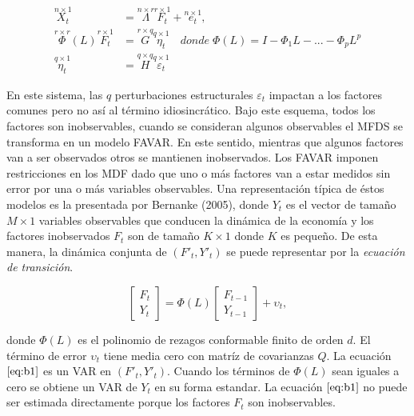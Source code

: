 \documentclass[a4paper,twoside,15pt]{article}
\begin{document}
\begin{align*}
	\overset{n \times 1}{X_t} &=\overset{n \times r}{\Lambda}\overset{r \times 1}{F_t}+\overset{n \times 1}{e_t}, \label{eq:f55} \tag{7} \\
	\overset{r \times r}{\Phi}(L)\overset{r \times 1}{F_t}&=  \overset{r \times q}{G}\overset{q \times 1}{\eta_t}\quad donde\; \Phi(L)=I-\Phi_1L-...-\Phi_pL^p \label{eq:f56} \tag{8}\\
	\overset{q \times 1}{\eta_t} & = \overset{q \times q}{H} \overset{q \times 1}{\varepsilon_t} \label{eq:f57 }\tag{9}
\end{align*}

En este sistema, las $q$ perturbaciones estructurales $\varepsilon_t$ impactan a los factores comunes pero no así al término idiosincrático.
Bajo este esquema, todos los factores son inobservables, cuando se consideran algunos observables el MFDS se transforma en un modelo FAVAR. En este sentido, mientras que algunos factores van a ser observados otros se mantienen inobservados. Los FAVAR imponen restricciones en los MDF dado que uno o más factores van a estar medidos sin error por una o más variables observables. Una representación típica de éstos modelos es la presentada por Bernanke (2005), donde $Y_t$ es el vector de tamaño $M \times 1$ variables observables que conducen la dinámica de la economía y los factores inobservados $F_t$ son de tamaño $K \times 1$ donde $K$ es pequeño. De esta manera, la dinámica conjunta de $(F '_t,Y'_t)$ se puede representar por la \textit{ecuación de transición}.



\begin{equation*}
\begin{bmatrix}
	F_t\\
	Y_t
\end{bmatrix}=\Phi(L)\begin{bmatrix}
	F_{t-1}\\
	Y_{t-1}
\end{bmatrix}+\upsilon_t,\label{eq:b1}\tag{10}
\end{equation*}

donde $\Phi(L)$ es el polinomio de rezagos conformable finito de orden $d$. El término de error $\upsilon_t$ tiene media cero con matríz de covarianzas $Q$. La ecuación $\eqref{eq:b1}$ es un VAR en $(F '_t,Y'_t)$. Cuando los términos de $\Phi(L)$ sean iguales a cero se obtiene un VAR de $Y_t$ en su forma estandar. La ecuación $\eqref{eq:b1}$ no puede ser estimada directamente porque los factores $F_t$ son inobservables. 
\end{document}

